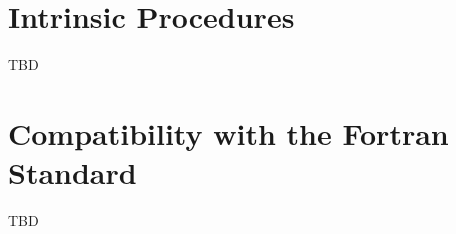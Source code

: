 \section{Intrinsic Procedures}
\label{sec:Intrinsic Procedures}

TBD



\section{Compatibility with the Fortran Standard}
\label{sec:Compatibility with the Fortran Standard}

TBD
